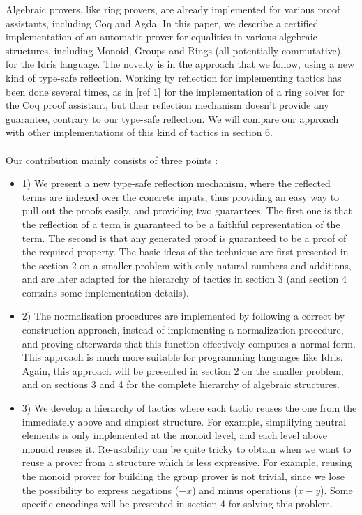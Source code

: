Algebraic provers, like ring provers, are already implemented for various proof assistants, including Coq and Agda. In this paper, we describe a certified implementation of an automatic prover for equalities in various algebraic structures, including Monoid, Groups and Rings (all potentially commutative), for the Idris language. The novelty is in the approach that we follow, using a new kind of type-safe reflection.
Working by reflection for implementing tactics has been done several times, as in [ref 1] for the implementation of a ring solver for the Coq proof assistant, but their reflection mechanism  doesn't provide any guarantee, contrary to our type-safe reflection. We will compare our approach with other implementations of this kind of tactics in section 6. \\
\\
Our contribution mainly consists of three points :
\begin{itemize}
	\item 1) We present a new type-safe reflection mechanism, where the reflected terms are indexed over the concrete inputs, thus providing an easy way to pull out the proofs easily, and providing two guarantees. The first one is that the reflection of a term is guaranteed to be a faithful representation of the term. The second is that any generated proof is guaranteed to be a proof of the required property. The basic ideas of the technique are first presented in the section 2 on a smaller problem with only natural numbers and additions, and are later adapted for the hierarchy of tactics in section 3 (and section 4 contains some implementation details).	
	\item 2) The normalisation procedures are implemented by following a correct by construction approach, instead of implementing a normalization procedure, and proving afterwards that this function effectively computes a normal form. This approach is much more suitable for programming languages like Idris. Again, this approach will be presented in section 2 on the smaller problem, and on sections 3 and 4 for the complete hierarchy of algebraic structures.
	\item 3) We develop a hierarchy of tactics where each tactic reuses the one from the immediately above and simplest structure. For example, simplifying neutral elements is only implemented at the monoid level, and each level above monoid reuses it. Re-usability can be quite tricky to obtain when we want to reuse a prover from a structure which is less expressive. For example, reusing the monoid prover for building the group prover is not trivial, since we lose the possibility to express negations ($-x$) and minus operations ($x-y$). Some specific encodings will be presented in section 4 for solving this problem.
\end{itemize}